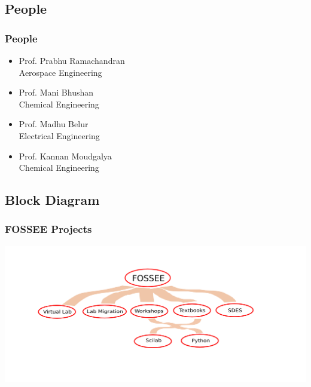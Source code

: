 \documentclass[compress,red]{beamer} %
\begin{document}
\subsection{People}
\begin{frame}
\frametitle{People}
\begin{itemize}
\item Prof. Prabhu Ramachandran \\ 
{\footnotesize Aerospace Engineering} \pause
\item Prof. Mani Bhushan \\
{\footnotesize Chemical Engineering}  \pause
\item Prof. Madhu Belur \\
{\footnotesize Electrical Engineering} \pause
\item Prof. Kannan Moudgalya \\
{\footnotesize Chemical Engineering} \pause
\end{itemize}
\end{frame}

\subsection{Block Diagram}
\begin{frame}
\frametitle{FOSSEE Projects}
\begin{center}
\includegraphics[scale=0.3]{blockdiagram.png}
\end{center}
\end{frame}
\end{document}
